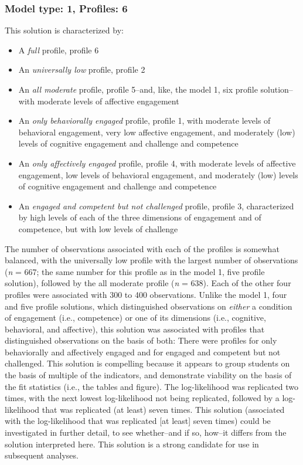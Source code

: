 \documentclass[]{book}
\providecommand{\tightlist}{%
  \setlength{\itemsep}{0pt}\setlength{\parskip}{0pt}}
\theoremstyle{definition}
\theoremstyle{definition}
\theoremstyle{definition}
\theoremstyle{remark}
\begin{document}
\subsubsection{Model type: 1, Profiles:
6}\label{model-type-1-profiles-6}

This solution is characterized by:

\begin{itemize}
\tightlist
\item
  A \emph{full} profile, profile 6
\item
  An \emph{universally low} profile, profile 2
\item
  An \emph{all moderate} profile, profile 5--and, like, the model 1, six
  profile solution--with moderate levels of affective engagement
\item
  An \emph{only behaviorally engaged} profile, profile 1, with moderate
  levels of behavioral engagement, very low affective engagement, and
  moderately (low) levels of cognitive engagement and challenge and
  competence
\item
  An \emph{only affectively engaged} profile, profile 4, with moderate
  levels of affective engagement, low levels of behavioral engagement,
  and moderately (low) levels of cognitive engagement and challenge and
  competence
\item
  An \emph{engaged and competent but not challenged} profile, profile 3,
  characterized by high levels of each of the three dimensions of
  engagement and of competence, but with low levels of challenge
\end{itemize}

The number of observations associated with each of the profiles is
somewhat balanced, with the universally low profile with the largest
number of observations (\emph{n} = 667; the same number for this profile
as in the model 1, five profile solution), followed by the all moderate
profile (\emph{n} = 638). Each of the other four profiles were
associated with 300 to 400 observations. Unlike the model 1, four and
five profile solutions, which distinguished observations on
\emph{either} a condition of engagement (i.e., competence) or one of its
dimensions (i.e., cognitive, behavioral, and affective), this solution
was associated with profiles that distinguished observations on the
basis of both: There were profiles for only behaviorally and affectively
engaged and for engaged and competent but not challenged. This solution
is compelling because it appears to group students on the basis of
multiple of the indicators, and demonstrate viability on the basis of
the fit statistics (i.e., the tables and figure). The log-likelihood was
replicated two times, with the next lowest log-likelihood not being
replicated, followed by a log-likelihood that was replicated (at least)
seven times. This solution (associated with the log-likelihood that was
replicated {[}at least{]} seven times) could be investigated in further
detail, to see whether--and if so, how--it differs from the solution
interpreted here. This solution is a strong candidate for use in
subsequent analyses.
\end{document}
